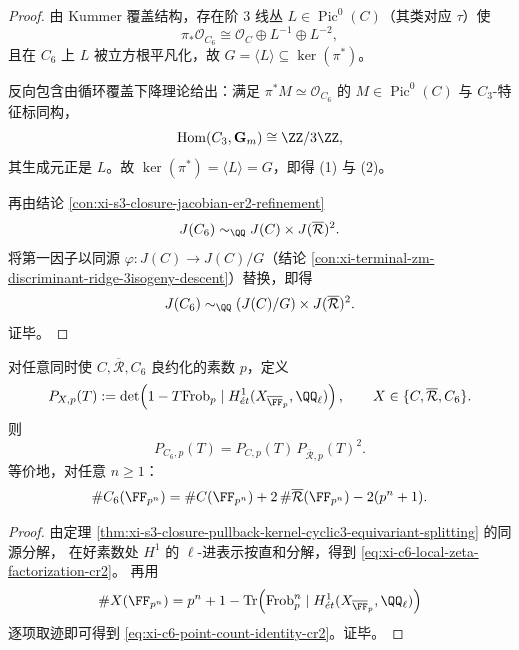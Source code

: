 \begin{proof}
由 Kummer 覆盖结构，存在阶 \(3\) 线丛 \(L\in\operatorname{Pic}^0(C)\)（其类对应 \(\tau\)）使
\[
\pi_*\mathcal O_{C_6}\cong \mathcal O_C\oplus L^{-1}\oplus L^{-2},
\]
且在 \(C_6\) 上 \(L\) 被立方根平凡化，故 \(G=\langle L\rangle\subseteq\ker(\pi^\ast)\)。

反向包含由循环覆盖下降理论给出：满足 \(\pi^\ast M\simeq\mathcal O_{C_6}\) 的 \(M\in\operatorname{Pic}^0(C)\)
与 \(C_3\)-特征标同构，
\[
\operatorname{Hom}(C_3,\mathbf G_m)\cong\ZZ/3\ZZ,
\]
其生成元正是 \(L\)。故 \(\ker(\pi^\ast)=\langle L\rangle=G\)，即得 (1) 与 (2)。

再由结论 \ref{con:xi-s3-closure-jacobian-er2-refinement}
\[
J(C_6)\sim_{\QQ}J(C)\times J(\overline{\mathcal R})^2.
\]
将第一因子以同源 \(\varphi:J(C)\to J(C)/G\)（结论 \ref{con:xi-terminal-zm-discriminant-ridge-3isogeny-descent}）替换，即得
\[
J(C_6)\sim_{\QQ}(J(C)/G)\times J(\overline{\mathcal R})^2.
\]
证毕。
\end{proof}

\begin{corollary}\label{cor:xi-s3-closure-local-zeta-factorization-c-r-square}
对任意同时使 \(C,\overline{\mathcal R},C_6\) 良约化的素数 \(p\)，定义
\[
P_{X,p}(T):=\det\!\left(1-T\mathrm{Frob}_p\mid H^1_{\acute et}(X_{\overline{\FF}_p},\QQ_\ell)\right),
\qquad X\in\{C,\overline{\mathcal R},C_6\}.
\]
则
\begin{equation}\label{eq:xi-c6-local-zeta-factorization-cr2}
P_{C_6,p}(T)=P_{C,p}(T)\,P_{\overline{\mathcal R},p}(T)^2.
\end{equation}
等价地，对任意 \(n\ge 1\)：
\begin{equation}\label{eq:xi-c6-point-count-identity-cr2}
\#C_6(\FF_{p^n})
=\#C(\FF_{p^n})+2\,\#\overline{\mathcal R}(\FF_{p^n})-2(p^n+1).
\end{equation}
\end{corollary}

\begin{proof}
由定理 \ref{thm:xi-s3-closure-pullback-kernel-cyclic3-equivariant-splitting} 的同源分解，
在好素数处 \(H^1\) 的 \(\ell\)-进表示按直和分解，得到
\eqref{eq:xi-c6-local-zeta-factorization-cr2}。
再用
\[
\#X(\FF_{p^n})=p^n+1-\operatorname{Tr}\!\left(\mathrm{Frob}_p^n\mid H^1_{\acute et}(X_{\overline{\FF}_p},\QQ_\ell)\right)
\]
逐项取迹即可得到 \eqref{eq:xi-c6-point-count-identity-cr2}。证毕。
\end{proof}

